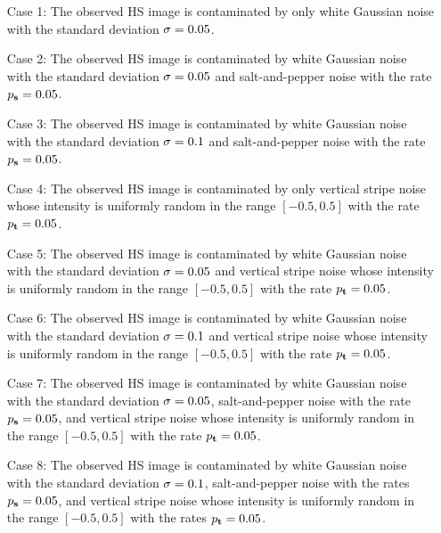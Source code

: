 \begin{itemize}
	\setlength{\leftskip}{18pt}
	\item [Case 1:] The observed HS image is contaminated by only white Gaussian noise with the standard deviation $\sigma = 0.05$.
	\item [Case 2:] The observed HS image is contaminated by white Gaussian noise with the standard deviation $\sigma = 0.05$ and salt-and-pepper noise with the rate $p_{\mathbf{s}} = 0.05$.
	\item [Case 3:] The observed HS image is contaminated by white Gaussian noise with the standard deviation $\sigma = 0.1$ and salt-and-pepper noise with the rate $p_{\mathbf{s}} = 0.05$.
	\item [Case 4:] {The observed HS image is contaminated by only vertical stripe noise whose intensity is uniformly random in the range $[-0.5, 0.5]$ with the rate $p_{\mathbf{t}} = 0.05$.}
	\item [Case 5:] The observed HS image is contaminated by white Gaussian noise with the standard deviation $\sigma = 0.05$ and vertical stripe noise whose intensity is uniformly random in the range $[-0.5, 0.5]$ with the rate $p_{\mathbf{t}} = 0.05$.
	\item [Case 6:] The observed HS image is contaminated by white Gaussian noise with the standard deviation $\sigma = 0.1$ and vertical stripe noise whose intensity is uniformly random in the range $[-0.5, 0.5]$ with the rate $p_{\mathbf{t}} = 0.05$.
	\item [Case 7:] The observed HS image is contaminated by white Gaussian noise with the standard deviation $\sigma = 0.05$, salt-and-pepper noise with the rate $p_{\mathbf{s}} = 0.05$, and vertical stripe noise whose intensity is uniformly random in the range $[-0.5, 0.5]$ with the rate $p_{\mathbf{t}} = 0.05$.
	\item [Case 8:] The observed HS image is contaminated by white Gaussian noise with the standard deviation $\sigma = 0.1$, salt-and-pepper noise with the rates $p_{\mathbf{s}} = 0.05$, and vertical stripe noise whose intensity is uniformly random in the range $[-0.5, 0.5]$ with the rates $p_{\mathbf{t}} = 0.05$.

\end{itemize}
